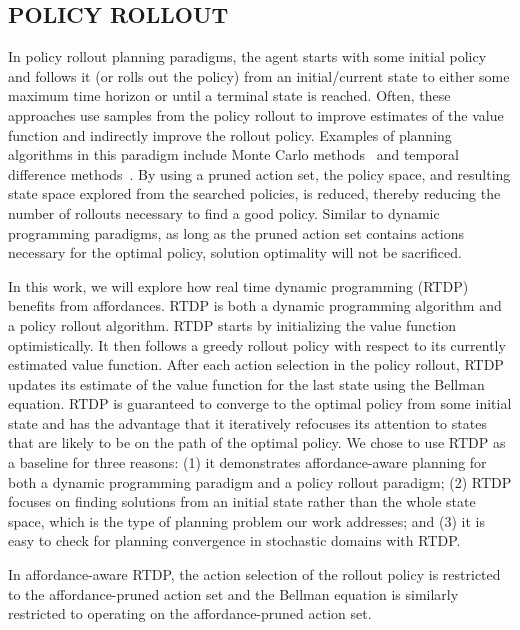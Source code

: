 \documentclass[]{article}
\begin{document}
\subsection{POLICY ROLLOUT}

In policy rollout planning paradigms, the agent starts with some
initial policy and follows it (or rolls out the policy) from an
initial/current state to either some maximum time horizon or until a
terminal state is reached. Often, these approaches use samples from
the policy rollout to improve estimates of the value function and
indirectly improve the rollout policy. Examples of planning algorithms
in this paradigm include Monte Carlo methods~\citep{browne12,
  silver10} and temporal difference
methods~\citep{sutton99,sutton1988lpm,rummery1994line,6313077,lagoudakis2003least,Peters:2008ve}.
By using a pruned
action set, the policy space, and resulting state space explored from
the searched policies, is reduced, thereby reducing the number of
rollouts necessary to find a good policy. Similar to dynamic
programming paradigms, as long as the pruned action set contains
actions necessary for the optimal policy, solution optimality will not
be sacrificed.

In this work, we will explore how real time dynamic programming
(RTDP)~\citep{barto95} benefits from affordances. RTDP is both a
dynamic programming algorithm and a policy rollout algorithm. RTDP
starts by initializing the value function optimistically. It then
follows a greedy rollout policy with respect to its currently
estimated value function. After each action selection in the policy
rollout, RTDP updates its estimate of the value function for the last
state using the Bellman equation. RTDP is guaranteed to converge to
the optimal policy from some initial state and has the advantage that
it iteratively refocuses its attention to states that are likely to be
on the path of the optimal policy. We chose to use RTDP as a baseline
for three reasons: (1) it demonstrates affordance-aware planning for
both a dynamic programming paradigm and a policy rollout paradigm;
(2) RTDP focuses on finding solutions from an initial state rather than the
whole state space, which is the type of planning problem our work addresses;
and (3) it is easy to check for planning convergence in stochastic domains
with RTDP.

In affordance-aware RTDP, the action selection of the rollout policy
is restricted to the affordance-pruned action set and the Bellman
equation is similarly restricted to operating on the affordance-pruned
action set.
\end{document}
